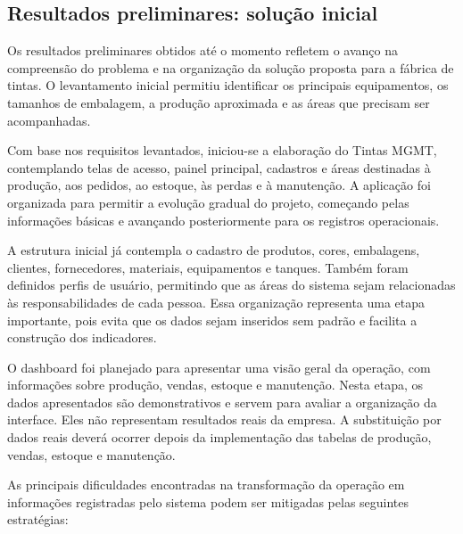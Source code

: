 \documentclass[12pt,a4paper]{article}
\begin{document}
\subsection{Resultados preliminares: solução inicial}
Os resultados preliminares obtidos até o momento refletem o avanço na compreensão do problema e na organização da solução proposta para a fábrica de tintas. O levantamento inicial permitiu identificar os principais equipamentos, os tamanhos de embalagem, a produção aproximada e as áreas que precisam ser acompanhadas.

Com base nos requisitos levantados, iniciou-se a elaboração do Tintas MGMT, contemplando telas de acesso, painel principal, cadastros e áreas destinadas à produção, aos pedidos, ao estoque, às perdas e à manutenção. A aplicação foi organizada para permitir a evolução gradual do projeto, começando pelas informações básicas e avançando posteriormente para os registros operacionais.

A estrutura inicial já contempla o cadastro de produtos, cores, embalagens, clientes, fornecedores, materiais, equipamentos e tanques. Também foram definidos perfis de usuário, permitindo que as áreas do sistema sejam relacionadas às responsabilidades de cada pessoa. Essa organização representa uma etapa importante, pois evita que os dados sejam inseridos sem padrão e facilita a construção dos indicadores.

O dashboard foi planejado para apresentar uma visão geral da operação, com informações sobre produção, vendas, estoque e manutenção. Nesta etapa, os dados apresentados são demonstrativos e servem para avaliar a organização da interface. Eles não representam resultados reais da empresa. A substituição por dados reais deverá ocorrer depois da implementação das tabelas de produção, vendas, estoque e manutenção.

As principais dificuldades encontradas na transformação da operação em informações registradas pelo sistema podem ser mitigadas pelas seguintes estratégias:
\end{document}

